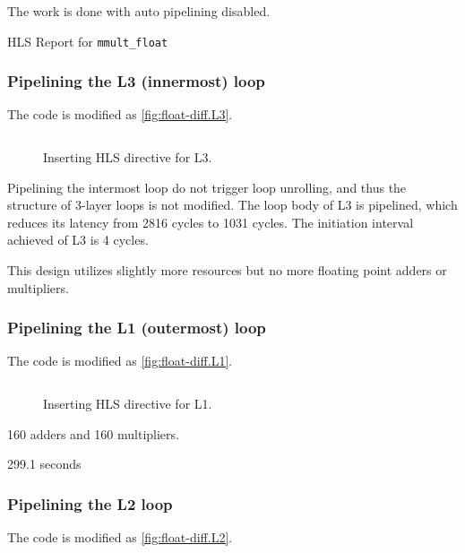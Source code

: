 The work is done with auto pipelining disabled.



\begin{sidewaystable}[p]
    \centering
    \caption{HLS Report for \texttt{mmult\_float}}\label{tab:float}
    
\end{sidewaystable}

\subsubsection{Pipelining the L3 (innermost) loop}\label{sec:1bL3}

The code is modified as \autoref{fig:float-diff.L3}.

\begin{figure}[h!]
    \centering
    \inputminted{diff}{program/diff.L3}
    \caption{Inserting HLS directive for L3.}\label{fig:float-diff.L3}
\end{figure}

Pipelining the intermost loop do not trigger loop unrolling,
and thus the structure of 3-layer loops is not modified.
The loop body of L3 is pipelined, which reduces its latency
from 2816 cycles to 1031 cycles.
The initiation interval achieved of L3 is 4 cycles.

This design utilizes slightly more resources but no more floating point
adders or multipliers.


\subsubsection{Pipelining the L1 (outermost) loop}\label{sec:1bL1}

The code is modified as \autoref{fig:float-diff.L1}.

\begin{figure}[h!]
    \centering
    \inputminted{diff}{program/diff.L1}
    \caption{Inserting HLS directive for L1.}\label{fig:float-diff.L1}
\end{figure}


160 adders and 160 multipliers.

299.1 seconds

\subsubsection{Pipelining the L2 loop}\label{sec:1bL2}

The code is modified as \autoref{fig:float-diff.L2}.

